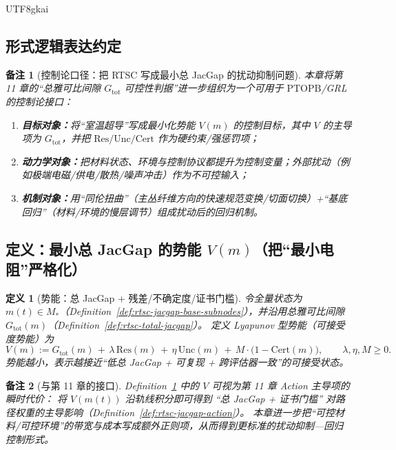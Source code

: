 \documentclass[12pt]{article}
\newtheorem{definition}{定义}[section]
\newtheorem{remark}{备注}[section]
\newcommand{\PTOPB}{\ensuremath{\mathrm{PTOPB}}}
\newcommand{\RTSC}{\textsf{RTSC}}
\begin{document}
\begin{CJK*}{UTF8}{gkai}
\subsection{形式逻辑表达约定}

\begin{remark}[控制论口径：把 \RTSC{} 写成最小总 JacGap 的扰动抑制问题]
本章将第 11 章的“总雅可比间隙 $G_{\mathrm{tot}}$ 可控性判据”进一步组织为一个可用于 \PTOPB/GRL 的控制论接口：
\begin{enumerate}
  \item \textbf{目标对象：}将“室温超导”写成最小化势能 $V(m)$ 的控制目标，其中 $V$ 的主导项为 $G_{\mathrm{tot}}$，并把 $\mathrm{Res}/\mathrm{Unc}
    /\mathrm{Cert}$ 作为硬约束/强惩罚项；
  \item \textbf{动力学对象：}把材料状态、环境与控制协议都提升为控制变量；外部扰动（例如极端电磁/供电/散热/噪声冲击）作为不可控输入；
  \item \textbf{机制对象：}用“同伦扭曲”（主丛纤维方向的快速规范变换/切面切换）+“基底回归”（材料/环境的慢层调节）组成扰动后的回归机制。
\end{enumerate}
\end{remark}

\subsection{定义：最小总 JacGap 的势能 $V(m)$（把“最小电阻”严格化）}

\begin{definition}[势能：总 JacGap + 残差/不确定度/证书门槛]
\label{def:rtsc-potential-V}
令全量状态为 $m(t)\in M_\ast$（Definition~\ref{def:rtsc-jacgap-base-subnodes}），并沿用总雅可比间隙 $G_{\mathrm{tot}}(m)
  $（Definition~\ref{def:rtsc-total-jacgap}）。
定义 Lyapunov 型势能（可接受度势能）为
\[
V(m)
:=
G_{\mathrm{tot}}(m)
\,+\,
\lambda\,\mathrm{Res}(m)
\,+\,
\eta\,\mathrm{Unc}(m)
\,+\,
M\cdot\bigl(1-\mathrm{Cert}(m)\bigr),
\qquad \lambda,\eta,M\ge 0.
\]
势能越小，表示越接近“低总 JacGap + 可复现 + 跨评估器一致”的可接受状态。
\end{definition}

\begin{remark}[与第 11 章的接口]
Definition~\ref{def:rtsc-potential-V} 中的 $V$ 可视为第 11 章 Action 主导项的瞬时代价：
将 $V(m(t))$ 沿轨线积分即可得到 “总 JacGap + 证书门槛” 对路径权重的主导影响（Definition~\ref{def:rtsc-jacgap-action}）。
本章进一步把“可控材料/可控环境”的带宽与成本写成额外正则项，从而得到更标准的扰动抑制—回归控制形式。
\end{remark}


\end{CJK*}
\end{document}
